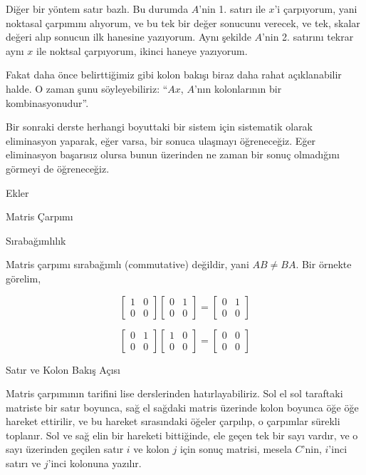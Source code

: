 \documentclass[12pt,fleqn]{article}\usepackage{../../common}
\begin{document}
Diğer bir yöntem satır bazlı. Bu durumda $A$'nin 1. satırı ile $x$'i
çarpıyorum, yani noktasal çarpımını alıyorum, ve bu tek bir değer sonucunu
verecek, ve tek, skalar değeri alıp sonucun ilk hanesine yazıyorum. Aynı
şekilde $A$'nin 2. satırını tekrar aynı $x$ ile noktsal çarpıyorum, ikinci
haneye yazıyorum. 

Fakat daha önce belirttiğimiz gibi kolon bakışı biraz daha rahat
açıklanabilir halde. O zaman şunu söyleyebiliriz: ``$Ax$, $A$'nın
kolonlarının bir kombinasyonudur''. 

Bir sonraki derste herhangi boyuttaki bir sistem için sistematik olarak
eliminasyon yaparak, eğer varsa, bir sonuca ulaşmayı öğreneceğiz. Eğer
eliminasyon başarısız olursa bunun üzerinden ne zaman bir sonuç olmadığını
görmeyi de öğreneceğiz. 

Ekler

Matris Çarpımı

Sırabağımlılık

Matris çarpımı sırabağımlı (commutative) değildir, yani $AB \ne BA$. Bir örnekte
görelim,

$$
\left[\begin{array}{cc}
1&0\\0&0
\end{array}\right]
\left[\begin{array}{cc}
0&1\\0&0
\end{array}\right]
=
\left[\begin{array}{cc}
0&1\\0&0
\end{array}\right]
$$

$$
\left[\begin{array}{cc}
0&1\\0&0
\end{array}\right]
\left[\begin{array}{cc}
1&0\\0&0
\end{array}\right]
=
\left[\begin{array}{cc}
0&0\\0&0
\end{array}\right]
$$

Satır ve Kolon Bakış Açısı

Matris çarpımının tarifini lise derslerinden hatırlayabiliriz. Sol el sol
taraftaki matriste bir satır boyunca, sağ el sağdaki matris üzerinde kolon
boyunca öğe öğe hareket ettirilir, ve bu hareket sırasındaki öğeler çarpılıp, o
çarpımlar sürekli toplanır. Sol ve sağ elin bir hareketi bittiğinde, ele geçen
tek bir sayı vardır, ve o sayı üzerinden geçilen satır $i$ ve kolon $j$ için
sonuç matrisi, mesela $C$'nin, $i$'inci satırı ve $j$'inci kolonuna yazılır.
\end{document}
